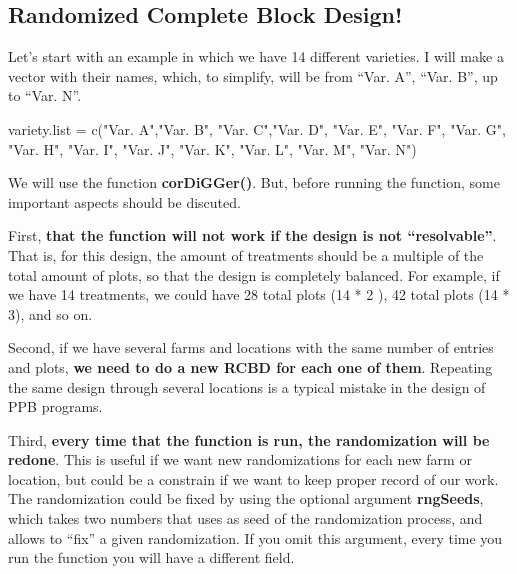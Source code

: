\documentclass[
]{book}
\newenvironment{Shaded}{\begin{snugshade}}{\end{snugshade}}
\newcommand{\FunctionTok}[1]{\textcolor[rgb]{0.00,0.00,0.00}{#1}}
\newcommand{\NormalTok}[1]{#1}
\newcommand{\OtherTok}[1]{\textcolor[rgb]{0.56,0.35,0.01}{#1}}
\newcommand{\StringTok}[1]{\textcolor[rgb]{0.31,0.60,0.02}{#1}}
\begin{document}
\hypertarget{randomized-complete-block-design}{%
\subsection{Randomized Complete Block Design!}\label{randomized-complete-block-design}}

Let's start with an example in which we have 14 different varieties. I will make a vector with their names, which, to simplify, will be from ``Var. A'', ``Var. B'', up to ``Var. N''.

\begin{Shaded}
\begin{Highlighting}[]
\NormalTok{variety.list }\OtherTok{=}  \FunctionTok{c}\NormalTok{(}\StringTok{"Var. A"}\NormalTok{,}\StringTok{"Var. B"}\NormalTok{, }\StringTok{"Var. C"}\NormalTok{,}\StringTok{"Var. D"}\NormalTok{,}
                  \StringTok{"Var. E"}\NormalTok{, }\StringTok{"Var. F"}\NormalTok{, }\StringTok{"Var. G"}\NormalTok{,  }\StringTok{"Var. H"}\NormalTok{,}
                  \StringTok{"Var. I"}\NormalTok{, }\StringTok{"Var. J"}\NormalTok{, }\StringTok{"Var. K"}\NormalTok{,  }\StringTok{"Var. L"}\NormalTok{,}
                  \StringTok{"Var. M"}\NormalTok{, }\StringTok{"Var. N"}\NormalTok{)}
\end{Highlighting}
\end{Shaded}

We will use the function \textbf{corDiGGer()}. But, before running the function, some important aspects should be discuted.

First, \textbf{that the function will not work if the design is not ``resolvable''}. That is, for this design, the amount of treatments should be a multiple of the total amount of plots, so that the design is completely balanced. For example, if we have 14 treatments, we could have 28 total plots (14 * 2 ), 42 total plots (14 * 3), and so on.

Second, if we have several farms and locations with the same number of entries and plots, \textbf{we need to do a new RCBD for each one of them}. Repeating the same design through several locations is a typical mistake in the design of PPB programs.

Third, \textbf{every time that the function is run, the randomization will be redone}. This is useful if we want new randomizations for each new farm or location, but could be a constrain if we want to keep proper record of our work. The randomization could be fixed by using the optional argument \textbf{rngSeeds}, which takes two numbers that uses as seed of the randomization process, and allows to ``fix'' a given randomization. If you omit this argument, every time you run the function you will have a different field.
\end{document}
